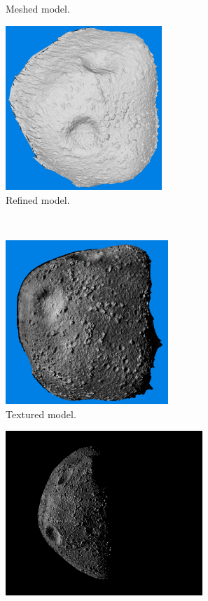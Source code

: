 \begin{figure}[htb]
\begin{subfigure}[b]{0.42\textwidth}
            \caption{Meshed model.}
            \label{fig:models_50_10_mesh}
        \end{subfigure}
        \begin{subfigure}[b]{0.42\textwidth}
            \centering
            \includegraphics[width=\textwidth,height=6.2cm]{doc/thesis/0_figures/models_quality/50_10/120_50_10_refine1.png}
            \caption{Refined model.}
            \label{fig:models_50_10_refine}
        \end{subfigure}
        \\
        \begin{subfigure}[b]{0.42\textwidth}
            \centering
            \includegraphics[width=\textwidth,height=6.2cm]{doc/thesis/0_figures/models_quality/50_10/120_50_10_texture1.png}
            \caption{Textured model.}
            \label{fig:models_50_10_texture}
        \end{subfigure}
        \begin{subfigure}[b]{0.42\textwidth}
            \centering
            \includegraphics[width=\textwidth,height=6.2cm]{doc/thesis/0_figures/models_quality/50_10/120_50_10_img1.png}

\end{subfigure}
\end{figure}
